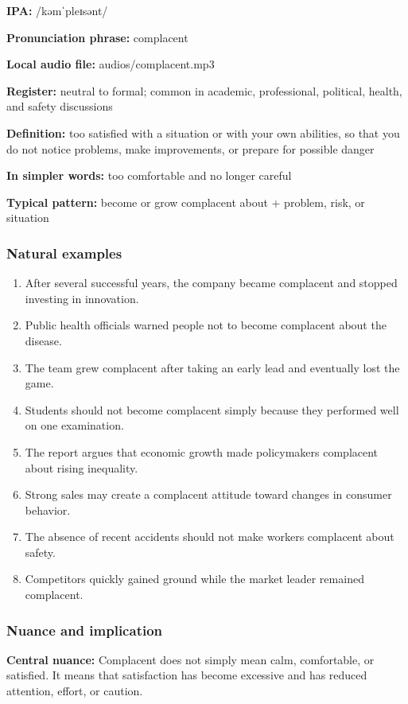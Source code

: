 \documentclass[11pt]{article}
\begin{document}
\textbf{IPA:} /kəmˈpleɪsənt/

\textbf{Pronunciation phrase:} complacent

\textbf{Local audio file:} audios/complacent.mp3

\textbf{Register:} neutral to formal; common in academic, professional, political, health, and safety discussions

\textbf{Definition:} too satisfied with a situation or with your own abilities, so that you do not notice problems, make improvements, or prepare for possible danger

\textbf{In simpler words:} too comfortable and no longer careful

\textbf{Typical pattern:} become or grow complacent about + problem, risk, or situation

\subsubsection{Natural examples}
\begin{enumerate}
  \item After several successful years, the company became complacent and stopped investing in innovation.
  \item Public health officials warned people not to become complacent about the disease.
  \item The team grew complacent after taking an early lead and eventually lost the game.
  \item Students should not become complacent simply because they performed well on one examination.
  \item The report argues that economic growth made policymakers complacent about rising inequality.
  \item Strong sales may create a complacent attitude toward changes in consumer behavior.
  \item The absence of recent accidents should not make workers complacent about safety.
  \item Competitors quickly gained ground while the market leader remained complacent.
\end{enumerate}

\subsubsection{Nuance and implication}
\textbf{Central nuance:} Complacent does not simply mean calm, comfortable, or satisfied. It means that satisfaction has become excessive and has reduced attention, effort, or caution.
\end{document}
